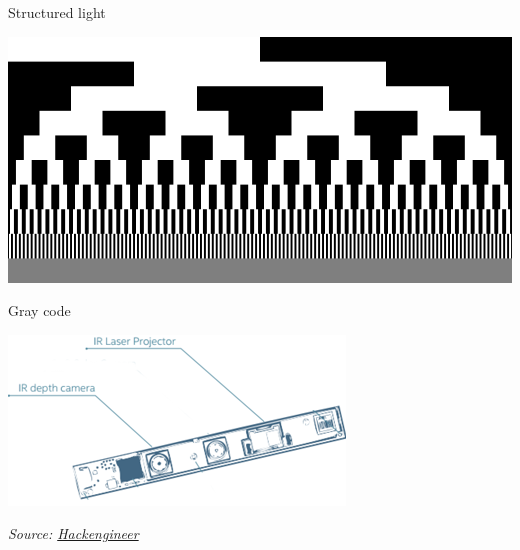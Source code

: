 \documentclass[compress]{beamer}
\newcommand{\source}[2]{{\tiny\it Source: \href{#1}{#2}}}
\begin{document}
\begin{frame}{Structured light}
{\begin{multicols}{2}
                \includegraphics[width=0.8\columnwidth]{structured_light_gray_code}

                Gray code
                \vspace{1cm}

                \includegraphics[width=\linewidth]{f200_module_simple}
\end{multicols}
        }

    \source{http://www.hackengineer.com/structured-light-vs-microsoft-kinect/}{Hackengineer}
\end{frame}
\end{document}
